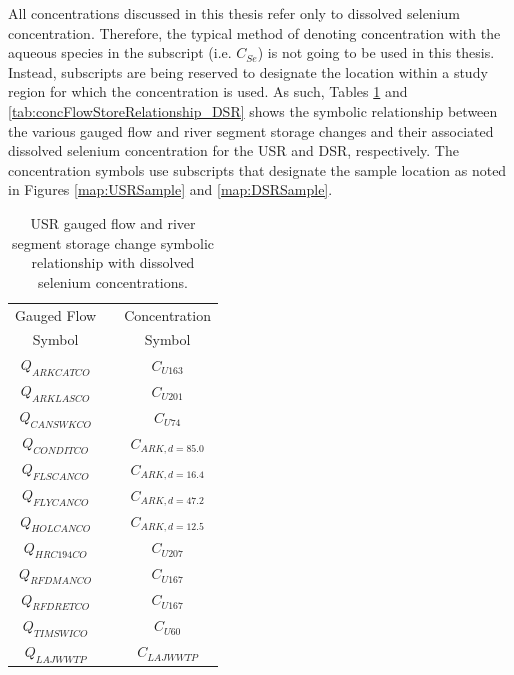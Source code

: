\begin{linenumbers}
All concentrations discussed in this thesis refer only to dissolved selenium concentration.  Therefore, the typical method of denoting concentration with the aqueous species in the subscript (i.e. $ C_{Se} $) is not going to be used in this thesis.  Instead, subscripts are being reserved to designate the location within a study region for which the concentration is used.  As such, Tables \ref{tab:concFlowStoreRelationship_USR} and \ref{tab:concFlowStoreRelationship_DSR} shows the symbolic relationship between the various gauged flow and  river segment storage changes and their associated dissolved selenium concentration for the USR and DSR, respectively.  The concentration symbols use subscripts that designate the sample location as noted in Figures \ref{map:USRSample} and \ref{map:DSRSample}.

\begin{table}[htbp]
	\centering
	\caption[USR gauged flow and river segment storage change symbolic relationship with dissolved selenium concentrations. ]{USR gauged flow and river segment storage change symbolic relationship with dissolved selenium concentrations.}
	\label{tab:concFlowStoreRelationship_USR}
	\begin{subtable}{\textwidth}
		\centering
		\begin{tabular}{c c c} 
			\toprule  
			Gauged Flow & & Concentration \\
			Symbol & & Symbol\\
			\toprule 
			$ Q_{ARKCATCO} $ & & $ C_{U163} $\\
			$ Q_{ARKLASCO} $ & & $ C_{U201} $\\
			$ Q_{CANSWKCO} $ & & $ C_{U74} $\\
			$ Q_{CONDITCO} $ & & $ C_{ARK,d=85.0} $\\
			$ Q_{FLSCANCO} $ & & $ C_{ARK,d=16.4} $\\
			$ Q_{FLYCANCO} $ & & $ C_{ARK,d=47.2} $\\
			$ Q_{HOLCANCO} $ & & $ C_{ARK,d=12.5} $\\
			$ Q_{HRC194CO} $ & & $ C_{U207} $\\
			$ Q_{RFDMANCO} $ & & $ C_{U167} $\\
			$ Q_{RFDRETCO} $ & & $ C_{U167} $\\
			$ Q_{TIMSWICO} $ & & $ C_{U60} $\\
			$ Q_{LAJWWTP} $ & & $ C_{LAJWWTP} $\\
			\bottomrule
		\end{tabular} \\

\end{subtable}
\end{table}
\end{linenumbers}
